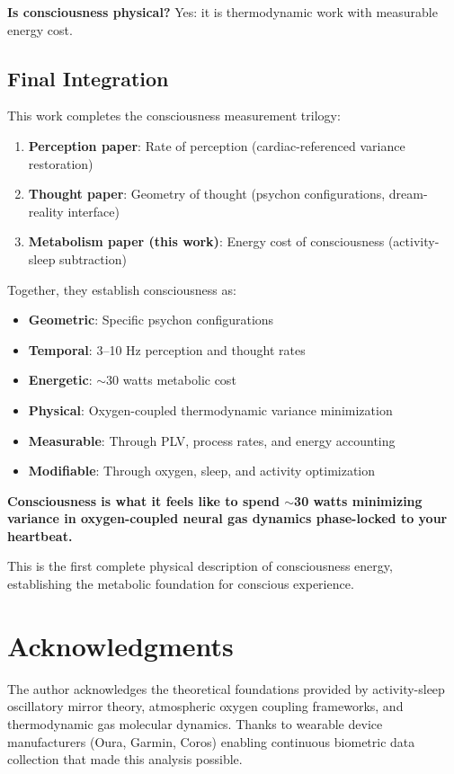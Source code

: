\documentclass[12pt]{article}
\theoremstyle{remark}
\begin{document}
\textbf{Is consciousness physical?} Yes: it is thermodynamic work with measurable energy cost.

\subsection{Final Integration}

This work completes the consciousness measurement trilogy:

\begin{enumerate}
\item \textbf{Perception paper}: Rate of perception (cardiac-referenced variance restoration)
\item \textbf{Thought paper}: Geometry of thought (psychon configurations, dream-reality interface)
\item \textbf{Metabolism paper (this work)}: Energy cost of consciousness (activity-sleep subtraction)
\end{enumerate}

Together, they establish consciousness as:
\begin{itemize}
\item \textbf{Geometric}: Specific psychon configurations
\item \textbf{Temporal}: 3--10 Hz perception and thought rates
\item \textbf{Energetic}: $\sim$30 watts metabolic cost
\item \textbf{Physical}: Oxygen-coupled thermodynamic variance minimization
\item \textbf{Measurable}: Through PLV, process rates, and energy accounting
\item \textbf{Modifiable}: Through oxygen, sleep, and activity optimization
\end{itemize}

\textbf{Consciousness is what it feels like to spend $\sim$30 watts minimizing variance in oxygen-coupled neural gas dynamics phase-locked to your heartbeat.}

This is the first complete physical description of consciousness energy, establishing the metabolic foundation for conscious experience.

\section*{Acknowledgments}

The author acknowledges the theoretical foundations provided by activity-sleep oscillatory mirror theory, atmospheric oxygen coupling frameworks, and thermodynamic gas molecular dynamics. Thanks to wearable device manufacturers (Oura, Garmin, Coros) enabling continuous biometric data collection that made this analysis possible.
\end{document}
